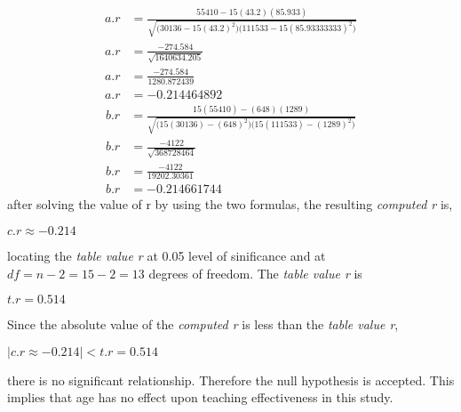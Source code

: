 \documentclass{article}
\begin{document}
    
    \begin{align*}
        a. r&=\frac{55410-15(43.2)(85.933)}{\sqrt{\bigl(30136-15(43.2)^2\bigr)\bigl(111533-15(85.93333333)^2\bigr)}}\\
        a.r&=\frac{-274.584}{\sqrt{1640634.205}}\\
        a.r&=\frac{-274.584}{1280.872439}\\
        a.r&=-0.214464892
    \end{align*}
    \clearpage
    \begin{align*}
        b.r&=\frac{15(55410)-(648)(1289)}{\sqrt{\bigl(15(30136)-(648)^2\bigr)\bigl(15(111533)-(1289)^2\bigr)}}\\
        b.r&=\frac{-4122}{\sqrt{368728464}}\\
        b.r&=\frac{-4122}{19202.30361}\\
        b.r&=-0.214661744
    \end{align*}
    after solving the value of r by using the two formulas, the resulting \emph{computed r} is,
    \begin{center}
        $c.r\approx-0.214$
    \end{center}
    locating the \emph{table value r} at 0.05 level of sinificance and at
        $df=n-2=15-2=13$
    degrees of freedom. The \emph{table value r} is
    \begin{center}
        $t.r=0.514$
    \end{center}
    Since the absolute value of the \emph{computed r} is less than the \emph{table value r}, 
    \begin{center}
        $|c.r\approx-0.214|<t.r=0.514$
    \end{center}
    there is no significant relationship. 
    Therefore the null hypothesis is accepted. This implies that age has no effect upon teaching effectiveness in this study.
    
    \newpage
\end{document}
